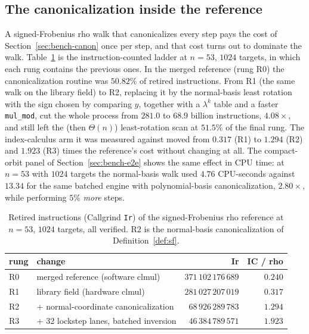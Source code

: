 \subsection{The canonicalization inside the reference}
\label{sec:bench-rho}

A signed-Frobenius rho walk that canonicalizes every step pays the
cost of Section~\ref{sec:bench-canon} once per step, and that cost
turns out to dominate the walk. Table~\ref{tab:rho-ladder} is the
instruction-counted ladder at $n=53$, $1024$ targets, in which each
rung contains the previous
ones.
In the merged reference (rung R0) the canonicalization routine was
$50.82\%$ of retired instructions. From R1 (the same walk on the
library field) to R2, replacing it by the normal-basis least rotation
with the sign chosen by comparing $y$, together with a $\lambda^k$
table and a faster \texttt{mul\_mod}, cut the whole process
from $281.0$ to $68.9$ billion instructions, $4.08\times$, and still
left the (then $\Theta(n)$) least-rotation scan at $51.5\%$ of the
final rung. The index-calculus arm it was measured against moved from
$0.317$ (R1) to $1.294$ (R2) and $1.923$ (R3) times the reference's
cost without changing at all.
The compact-orbit panel of Section~\ref{sec:bench-e2e} shows the same
effect in CPU time: at $n=53$ with $1024$ targets the normal-basis
walk used $4.76$ CPU-seconds against $13.34$ for the same batched
engine with polynomial-basis canonicalization, $2.80\times$, while
performing $5\%$ \emph{more} steps.

\begin{table}[t]
\centering\small
\caption{Retired instructions (Callgrind \texttt{Ir}) of the signed-Frobenius rho reference at $n=53$, $1024$ targets, all verified. R2 is the normal-basis canonicalization of Definition~\ref{def:sf}.}
\label{tab:rho-ladder}
\begin{tabular}{@{}llrr@{}}
\toprule
rung & change & Ir & IC / rho \\
\midrule
R0 & merged reference (software clmul) & $371\,102\,176\,689$ & $0.240$ \\
R1 & library field (hardware clmul) & $281\,027\,207\,019$ & $0.317$ \\
R2 & $+$ normal-coordinate canonicalization & $68\,926\,289\,783$ & $1.294$ \\
R3 & $+$ 32 lockstep lanes, batched inversion & $46\,384\,789\,571$ & $\mathbf{1.923}$ \\
\bottomrule
\end{tabular}
\end{table}

